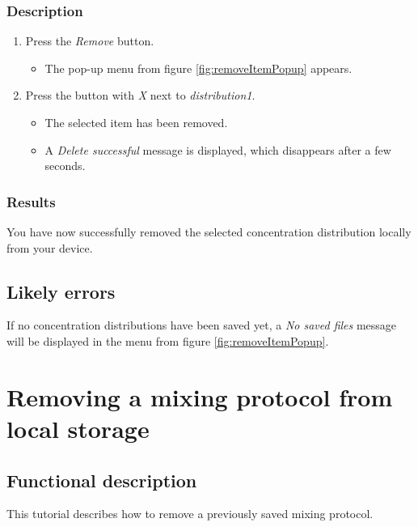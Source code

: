 \subsubsection{Description}
\begin{enumerate}
	\item Press the \emph{Remove} button.
		\begin{itemize}
			\item The pop-up menu from figure \ref{fig:removeItemPopup} appears.
		\end{itemize}
	\item Press the button with \emph{X} next to \emph{distribution1}.
		\begin{itemize}
			\item The selected item has been removed.
			\item A \emph{Delete successful} message is displayed, which disappears after a few seconds.
		\end{itemize}
\end{enumerate}

\subsubsection{Results}
You have now successfully removed the selected concentration distribution locally from your device.

\subsection{Likely errors}
If no concentration distributions have been saved yet, a \emph{No saved files} message will be displayed in the menu from figure \ref{fig:removeItemPopup}.

\section{Removing a mixing protocol from local storage}\label{sec:remmixprot}

\subsection{Functional description}
This tutorial describes how to remove a previously saved mixing protocol.

